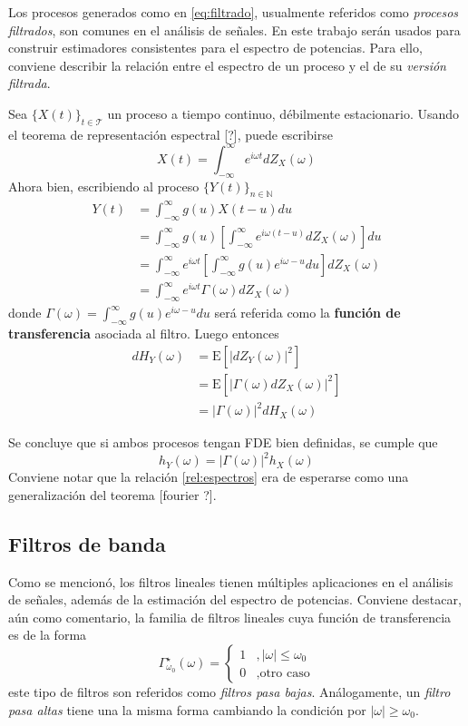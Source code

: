 \documentclass[12pt,letterpaper,draft]{book}
\newcommand{\intR}{\int_{-\infty}^{\infty}}
\newcommand{\E}[1]{\mathrm{E}\left[ #1 \right]}
\newcommand{\abso}[1]{\left| #1 \right|}
\newcommand{\xt}{$\{X(t)\}_{t\in \mathcal{T}}$ }
\begin{document}
Los procesos generados como en \ref{eq:filtrado}, usualmente referidos como \textit{procesos filtrados}, son comunes en el análisis de señales. 
%
En este trabajo serán usados para construir estimadores consistentes para el espectro de potencias.
%
Para ello, conviene describir la relación entre el espectro de un proceso y el de su \textit{versión filtrada}.

Sea \xt un proceso a tiempo continuo, débilmente estacionario. Usando el teorema de representación espectral [?], puede escribirse
\begin{equation}
X(t) = \intR e^{i \omega t }  dZ_X(\omega)
\end{equation}
Ahora bien, escribiendo al proceso $\{Y(t)\}_{n\in \mathbb{N}}$
\begin{align*}
Y(t) &= \intR g(u) X(t-u) du \\
&= \intR g(u) \left[ \intR e^{i \omega (t-u) }  dZ_X(\omega) \right] du \\
&= \intR e^{i \omega t } \left[ \intR g(u) e^{i \omega -u } du \right] dZ_X(\omega) \\
&= \intR e^{i \omega t } \Gamma(\omega) dZ_X(\omega)
\end{align*}
donde $\Gamma(\omega) = \intR g(u) e^{i \omega -u } du$ será referida como la \textbf{función de transferencia} asociada al filtro. 
%
Luego entonces
\begin{align*}
dH_Y(\omega) &= \E{\abso{dZ_Y(\omega)}^{2}}  \\
&= \E{\abso{\Gamma(\omega) dZ_X(\omega)}^{2}}  \\
&= \abso{\Gamma(\omega)}^{2} dH_X(\omega)
\end{align*}

Se concluye que si ambos procesos tengan FDE bien definidas, se cumple que
\begin{equation}
h_Y(\omega) = \abso{\Gamma(\omega)}^{2} h_X(\omega)
\label{rel:espectros}
\end{equation}
Conviene notar que la relación \ref{rel:espectros} era de esperarse como una generalización del teorema [fourier ?].

\subsection{Filtros de banda}

Como se mencionó, los filtros lineales tienen múltiples aplicaciones en el análisis de señales, además de la estimación del espectro de potencias.
%
Conviene destacar, aún como comentario, la familia de filtros lineales cuya función de transferencia es de la forma
\begin{equation}
\Gamma_{\omega_0}^{\star} (\omega) = \begin{cases}
1 &, \abso{\omega} \leq \omega_0 \\
0 &, \text{otro caso}
\end{cases}
\end{equation}
este tipo de filtros son referidos como \textit{filtros pasa bajas}.
%
Análogamente, un \textit{filtro pasa altas} tiene una la misma forma cambiando la condición por $\abso{\omega} \geq \omega_0$.
\end{document}
